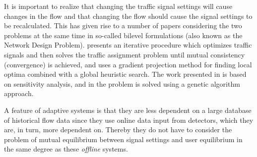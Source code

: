 It is important to realize that changing the traffic signal settings
will cause changes in the flow and that changing the flow should cause
the signal settings to be recalculated. This has given rise to a
number of papers considering the two problems at the same time in
so-called bilevel formulations (also known as the Network Design
Problem). \citet{mc} presents an iterative procedure which optimizes
traffic signals and then solves the traffic assignment problem until
mutual consistency (convergence) is achieved, and \citet{34} uses a
gradient projection method for finding local optima combined with a
global heuristic search. The work presented in \citet{20} is based on
sensitivity analysis, and in \citet{2,27} the problem is solved using a
genetic algorithm approach.

A feature of adaptive systems is that they are less dependent on a
large database of historical flow data since they use online data
input from detectors, which they are, in turn, more dependent
on. Thereby they do not have to consider the problem of mutual
equilibrium between signal settings and user equilibrium in the same
degree as these \textit{offline} systems.
